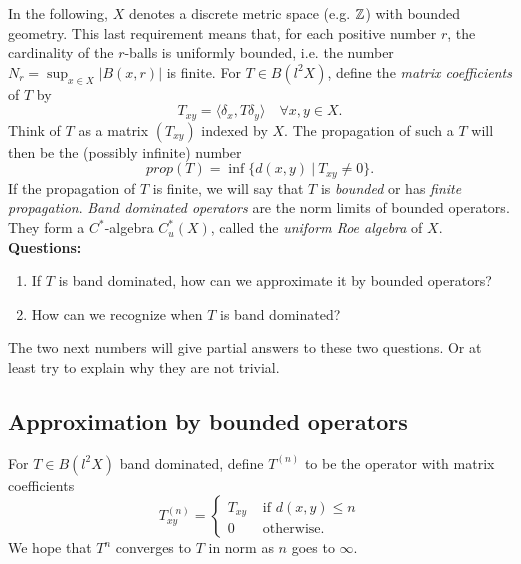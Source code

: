 In the following, $X$ denotes a discrete metric space (e.g. $\mathbb Z$) with bounded geometry. This last requirement means that, for each positive number $r$, the cardinality of the $r$-balls is uniformly bounded, i.e. the number $N_r = \sup_{x\in X } |B(x,r)|$ is finite. For $T\in B(l^2 X)$, define the \textit{matrix coefficients} of $T$ by
\[T_{xy} = \langle \delta_x , T\delta_y \rangle \quad  \forall x,y\in X.\]
Think of $T$ as a matrix $(T_{xy})$ indexed by $X$. The propagation of such a $T$ will then be the (possibly infinite) number
\[prop(T) = \inf \{d(x,y) \ | \ T_{xy} \neq 0 \}. \]
If the propagation of $T$ is finite, we will say that $T$ is \textit{bounded} or has \textit{finite propagation}. \textit{Band dominated operators} are the norm limits of bounded operators. They form a $C^*$-algebra $C^*_u(X)$, called the \textit{uniform Roe algebra} of $X$.\\

\textbf{Questions:} 
\begin{enumerate}
\item If $T$ is band dominated, how can we approximate it by bounded operators?
\item How can we recognize when $T$ is band dominated?
\end{enumerate}

The two next numbers will give partial answers to these two questions. Or at least try to explain why they are not trivial.

\subsection{Approximation by bounded operators}

For $T\in B(l^2X)$ band dominated, define $T^{(n)}$ to be the operator with matrix coefficients
\[T^{(n)}_{xy} = \left\{ \begin{array}{lr} T_{xy} & \text{ if }d(x,y)\leq n  \\ 0 & \text{ otherwise. }\end{array}\right. \] 
We hope that $T^{n}$ converges to $T$ in norm as $n$ goes to $\infty$.\\


